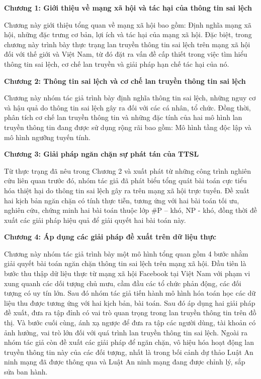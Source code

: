 {\bfseries Chương 1: Giới thiệu về mạng xã hội và tác hại của thông tin sai lệch}

Chương này giới thiệu tổng quan về mạng xã hội bao gồm: Định nghĩa mạng xã hội, những đặc trưng cơ bản, lợi ích và tác hại của mạng xã hội. Đặc biệt, trong chương này trình bày thực trạng lan truyền thông tin sai lệch trên mạng xã hội đối với thế giới và Việt Nam, từ đó đặt ra vấn đề cấp thiết trong việc tìm hiểu thông tin sai lệch, cơ chế lan truyền và giải pháp hạn chế tác hại của nó.

{\bfseries Chương 2: Thông tin sai lệch và cơ chế lan truyền thông tin sai lệch}

Chương này nhóm tác giả trình bày định nghĩa thông tin sai lệch, những nguy cơ và hậu quả do thông tin sai lệch gây ra đối với các cá nhân, tổ chức. Đồng thời, phân tích cơ chế lan truyền thông tin và những đặc tính của hai mô hình lan truyền thông tin đang được sử dụng rộng rãi bao gồm: Mô hình tầng độc lập và mô hình ngưỡng tuyến tính.

{\bfseries Chương 3: Giải pháp ngăn chặn sự phát tán của TTSL}

Từ thực trạng đã nêu trong Chương 2 và xuất phát từ những công trình nghiên cứu liên quan trước đó, nhóm tác giả đã phát biểu tổng quát bài toán cực tiểu hóa thiệt hại do thông tin sai lệch gây ra trên mạng xã hội trực tuyến. Đề xuất hai kịch bản ngăn chặn có tính thực tiễn, tương ứng với hai bài toán tối ưu, nghiên cứu, chứng minh hai bài toán thuộc lớp \#P – khó, NP - khó, đồng thời đề xuất các giải pháp hiệu quả để giải quyết hai bài toán này.

{\bfseries Chương 4: Áp dụng các giải pháp đề xuất trên dữ liệu thực}

Chương này nhóm tác giả trình bày một mô hình tổng quan gồm 4 bước nhằm giải quyết bài toán ngăn chặn thông tin sai lệch trên mạng xã hội. Đầu tiên là bước thu thập dữ liệu thực từ mạng xã hội Facebook tại Việt Nam với phạm vi xung quanh các dối tượng chủ mưu, cầm đầu các tổ chức phản động, các đối tượng có uy tín lớn. Sau đó nhóm tác giả tiến hành mô hình hóa toán học các dữ liệu thu được tương ứng với hai kịch bản, bài toán. Sau đó áp dụng hai giải pháp đề xuất, đưa ra tập đỉnh có vai trò quan trọng trong lan truyền thông tin trên đồ thị. Và bước cuối cùng, ánh xạ ngược để đưa ra tập các người dùng, tài khoản có ảnh hưởng, vai trò lớn đối với quá trình lan truyền thông tin sai lệch. Ngoài ra nhóm tác giả còn đề xuất các giải pháp để ngăn chặn, vô hiệu hóa hoạt động lan truyền thông tin này của các đối tượng, nhất là trong bối cảnh dự thảo Luật An ninh mạng đã được thông qua và Luật An ninh mạng đang được chỉnh lý, sắp sửa ban hành.